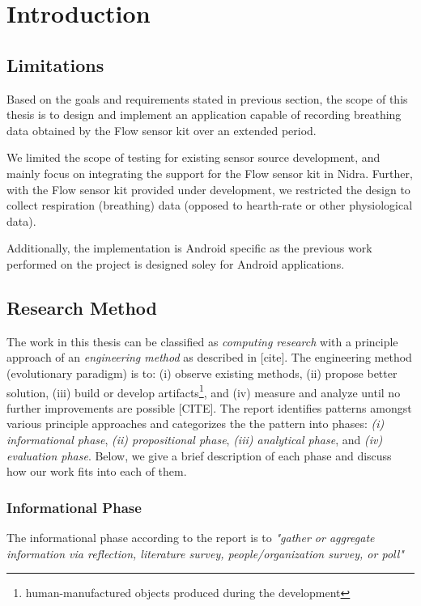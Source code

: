 \chapter{Introduction}\label{introduction}




\section{Limitations}
Based on the goals and requirements stated in previous section, the scope of this thesis is to design and implement an application capable of recording breathing data obtained by the Flow sensor kit over an extended period. 

We limited the scope of testing for existing sensor source development, and mainly focus on integrating the support for the Flow sensor kit in Nidra. Further, with the Flow sensor kit provided under development, we restricted the design to collect respiration (breathing) data (opposed to hearth-rate or other physiological data).

Additionally, the implementation is Android specific as the previous work performed on the project is designed soley for Android applications. 

\section{Research Method}
The work in this thesis can be classified as \textit{computing research} with a principle approach of an \textit{engineering method} as described in [cite]. The engineering method (evolutionary paradigm) is to: (i) observe existing methods, (ii) propose better solution, (iii)  build or develop artifacts\footnote{human-manufactured objects produced during the development}, and (iv) measure and analyze until no further improvements are possible [CITE]. The report identifies patterns amongst various principle approaches and categorizes the the pattern into phases: \textit{(i) informational phase}, \textit{(ii) propositional phase}, \textit{(iii) analytical phase}, and \textit{(iv) evaluation phase}. Below, we give a brief description of each phase and discuss how our work fits into each of them. 

\subsection{Informational Phase}
The informational phase according to the report is to \textit{"gather or aggregate information via reflection, literature survey, people/organization survey, or poll"}

